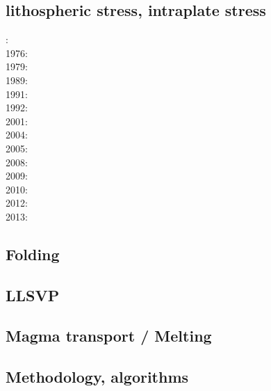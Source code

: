 \cite{baeg14}


\subsection*{lithospheric stress, intraplate stress}

: \cite{fouy75}\\
1976: \cite{riso76}\\
1979: \cite{riso79}\\
1989: \cite{boww89}\\
1991: \cite{worg91}\\
1992: \cite{rich92}\cite{wuvr92}\cite{zoba92}\cite{clko92}\\
2001: \cite{stsm01}\\
2004: \cite{ligu04}\\
2005: \cite{timr05}\\
2008: \cite{bilr08}\cite{ghhw08}\\
2009: \cite{ghhf09}\cite{nacl09}\\
2010: \cite{bepo10}\\
2012: \cite{nalr12}\cite{ghho12}\\
2013: \cite{ghhw13}


\subsection*{Folding}

\noindent
\cite{ramb68}
\cite{ramb70}
\cite{ramb71}
\cite{reds12}
\cite{regc13}

\subsection*{LLSVP}

\cite{limc13}
\cite{budt14}

\subsection*{Magma transport / Melting}

\cite{yatd12}
\cite{lorg18}

\subsection*{Methodology, algorithms}

